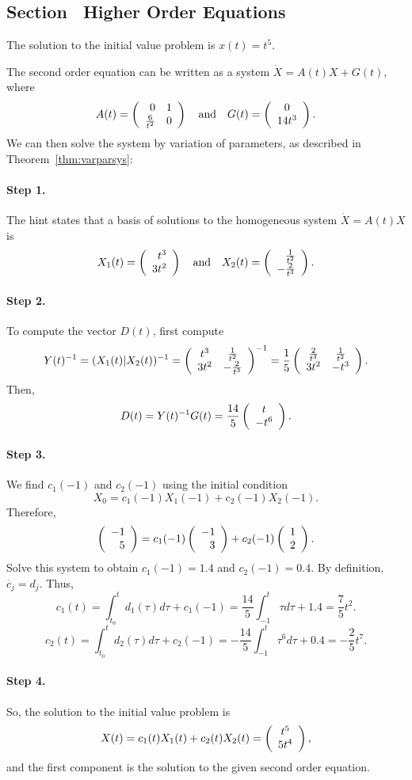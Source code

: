 \documentclass{ximera}
\begin{document}
\subsection*{Section~\protect{\ref{S:RO}} Higher Order Equations}

 \ans The solution to the initial value problem is 
$x(t) = t^5$.

\soln The second order equation can be written as a system
$\dot{X} = A(t)X + G(t)$, where
\[
A(t) = \left(\begin{array}{rr} 0 & 1\\ \frac{6}{t^2} &0\end{array}\right) \quad\mbox{and}\quad G(t) = \left(\begin{array}{c} 0 \\ 14t^3\end{array}\right).
\]
We can then solve the system by variation of parameters, as described in
Theorem~\ref{thm:varparsys}:

\paragraph{Step 1.} The hint states that
a basis of solutions to the homogeneous system
$\dot{X} = A(t)X$ is
\[
X_1(t) = \left(\begin{array}{r} t^3 \\ 3t^2\end{array}\right) \quad\mbox{and}\quad X_2(t) =
\left(\begin{array}{r} \frac{1}{t^2} \\ -\frac{2}{t^3}\end{array}\right).
\]
\paragraph{Step 2.} To compute the vector $D(t)$, first compute
\[
Y(t)^{-1} = (X_1(t)|X_2(t))^{-1} =
\left(\begin{array}{cc} t^3 & \frac{1}{t^2}\\ 3t^2 &-\frac{2}{t^3}\end{array}\right)^{-1} =
\frac{1}{5}\left(\begin{array}{cc} \frac{2}{t^3} & \frac{1}{t^2}\\ 3t^2 &-t^3\end{array}\right).
\]
Then,
\[
D(t) = Y(t)^{-1}G(t) =
\frac{14}{5}\left(\begin{array}{c} t \\ -t^6\end{array}\right).
\]
\paragraph{Step 3.} We find $c_1(-1)$ and $c_2(-1)$ using the initial
condition
\[
X_0 = c_1(-1)X_1(-1) + c_2(-1)X_2(-1).
\]
Therefore,
\[
\left(\begin{array}{r} -1 \\ 5\end{array}\right) = c_1(-1)\left(\begin{array}{r} -1 \\ 3\end{array}\right) + c_2(-1)\left(\begin{array}{r} 1 \\ 2\end{array}\right).
\]
Solve this system to obtain $c_1(-1) = 1.4$ and $c_2(-1) = 0.4$.  By
definition,
$\dot{c_j} = d_j$.  Thus,
\[
c_1(t) = \int_{t_0}^td_1(\tau)d\tau + c_1(-1)
= \frac{14}{5}\int_{-1}^t\tau d\tau + 1.4 = \frac{7}{5}t^2.
\]
\[
c_2(t) = \int_{t_0}^td_2(\tau)d\tau + c_2(-1)
= -\frac{14}{5}\int_{-1}^t\tau^6 d\tau + 0.4= -\frac{2}{5}t^7.
\]
\paragraph{Step 4.} So, the solution to the initial value problem is
\[
X(t) = c_1(t)X_1(t) + c_2(t)X_2(t) = \left(\begin{array}{c} t^5 \\ 5t^4\end{array}\right),
\]
and the first component is the solution to the given second order
equation.
\end{document}
